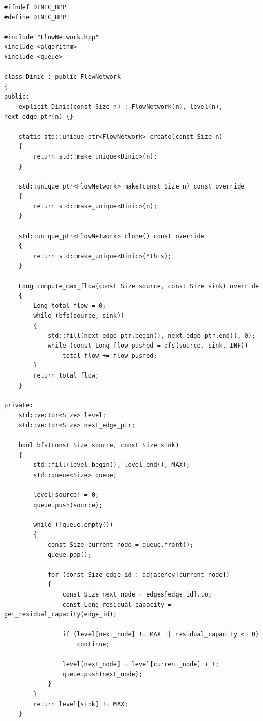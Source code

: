 \documentclass[12pt,a4paper]{article}
\begin{document}
\newpage

\label{ap:dinic}

\begin{lstlisting}[caption={Implementação em C++ da classe \lstinline{Dinic}, estruturada com Digrafo de Níveis e otimização de ponteiros mortos no cálculo do fluxo bloqueador.}, label={lst:dinic}]
#ifndef DINIC_HPP
#define DINIC_HPP

#include "FlowNetwork.hpp"
#include <algorithm>
#include <queue>

class Dinic : public FlowNetwork
{
public:
	explicit Dinic(const Size n) : FlowNetwork(n), level(n), next_edge_ptr(n) {}

	static std::unique_ptr<FlowNetwork> create(const Size n)
	{
		return std::make_unique<Dinic>(n);
	}

	std::unique_ptr<FlowNetwork> make(const Size n) const override
	{
		return std::make_unique<Dinic>(n);
	}

	std::unique_ptr<FlowNetwork> clone() const override
	{
		return std::make_unique<Dinic>(*this);
	}

	Long compute_max_flow(const Size source, const Size sink) override
	{
		Long total_flow = 0;
		while (bfs(source, sink))
		{
			std::fill(next_edge_ptr.begin(), next_edge_ptr.end(), 0);
			while (const Long flow_pushed = dfs(source, sink, INF))
				total_flow += flow_pushed;
		}
		return total_flow;
	}

private:
	std::vector<Size> level;
	std::vector<Size> next_edge_ptr;

	bool bfs(const Size source, const Size sink)
	{
		std::fill(level.begin(), level.end(), MAX);
		std::queue<Size> queue;

		level[source] = 0;
		queue.push(source);

		while (!queue.empty())
		{
			const Size current_node = queue.front();
			queue.pop();

			for (const Size edge_id : adjacency[current_node])
			{
				const Size next_node = edges[edge_id].to;
				const Long residual_capacity = get_residual_capacity(edge_id);

				if (level[next_node] != MAX || residual_capacity <= 0)
					continue;

				level[next_node] = level[current_node] + 1;
				queue.push(next_node);
			}
		}
		return level[sink] != MAX;
	}


\end{lstlisting}
\end{document}
